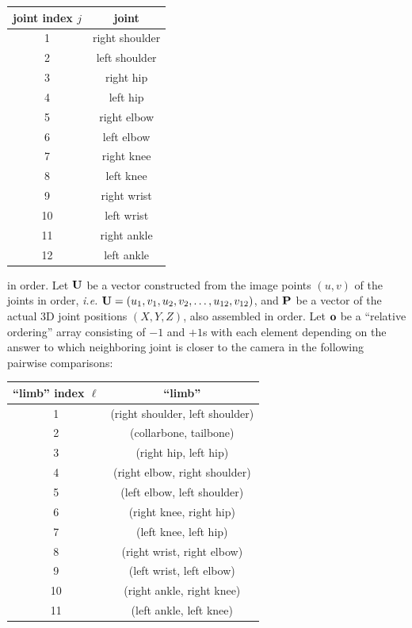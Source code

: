 \documentclass[final]{article}
\begin{document}
\begin{spacing}{1.1}
\begin{center}
  \begin{tabular}{cc}
    \toprule[1.5pt]
    joint index $j$ & joint \\
    \midrule[1pt]
    1 & right shoulder \\
    2 & left shoulder \\
    3 & right hip \\
    4 & left hip \\
    5 & right elbow \\
    6 & left elbow \\
    7 & right knee \\
    8 & left knee \\
    9 & right wrist \\
    10 & left wrist \\
    11 & right ankle \\
    12 & left ankle \\
    \bottomrule[1.5pt]
  \end{tabular}
\end{center}
 in order. Let $\vb{U}$ be a vector constructed from the image points $(u,v)$ of the joints in order, \emph{i.e.} $\vb{U} = (u_1,v_1,u_2,v_2,\ldots,u_{12},v_{12})$, and $\vb{P}$ be a vector of the actual 3D joint positions $(X,Y,Z)$, also assembled in order. Let $\vb{o}$ be a ``relative ordering'' array consisting of $-1$ and $+1$s with each element depending on the answer to which neighboring joint is closer to the camera in the following pairwise comparisons: 
\begin{center}
  \begin{tabular}{cc}
    \toprule[1.5pt]
    ``limb'' index $\ell$ & ``limb'' \\
    \midrule[1pt]
    1 & (right shoulder, left shoulder) \\
    2 & (collarbone, tailbone) \\
    3 & (right hip, left hip) \\
    4 & (right elbow, right shoulder) \\
    5 & (left elbow, left shoulder) \\
    6 & (right knee, right hip) \\
    7 & (left knee, left hip) \\
    8 & (right wrist, right elbow) \\
    9 & (left wrist, left elbow) \\
    10 & (right ankle, right knee) \\
    11 & (left ankle, left knee) \\
    \bottomrule[1.5pt]
  \end{tabular}
\end{center}
 

\end{spacing}
\end{document}
